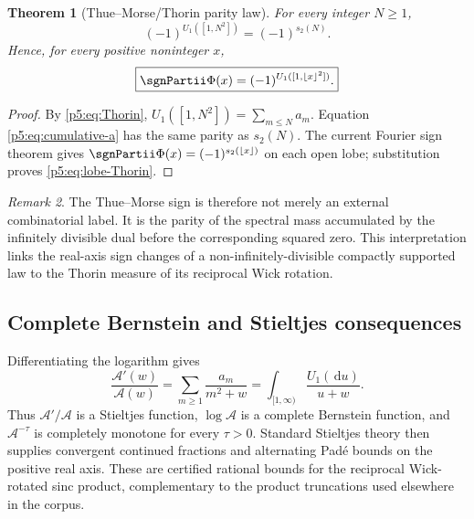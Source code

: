 \documentclass[11pt]{article}
\numberwithin{equation}{section}
\newtheorem{theorem}{Theorem}[section]
\theoremstyle{definition}
\theoremstyle{remark}
\newtheorem{remark}[theorem]{Remark}
\newcommand{\dd}{\,\mathrm d}
\begin{document}
\begin{theorem}[Thue--Morse/Thorin parity law]\label{p5:thm:Thorin-parity}
For every integer $N\ge1$,
\begin{equation}\label{p5:eq:Thorin-parity}
 \boxed{
 (-1)^{U_1([1,N^2])}=(-1)^{s_2(N)}.}
\end{equation}
Hence, for every positive noninteger $x$,
\begin{equation}\label{p5:eq:lobe-Thorin}
 \boxed{
 \sgnPartii\Phi(x)=(-1)^{U_1([1,\lfloor x\rfloor^2])}.}
\end{equation}
\end{theorem}

\begin{proof}
By \cref{p5:eq:Thorin}, $U_1([1,N^2])=\sum_{m\le N}a_m$.
Equation \cref{p5:eq:cumulative-a} has the same parity as $s_2(N)$.  The current
Fourier sign theorem gives
$\sgnPartii\Phi(x)=(-1)^{s_2(\lfloor x\rfloor)}$ on each open lobe; substitution
proves \cref{p5:eq:lobe-Thorin}.
\end{proof}

\begin{remark}
The Thue--Morse sign is therefore not merely an external combinatorial label.
It is the parity of the spectral mass accumulated by the infinitely divisible
dual before the corresponding squared zero.  This interpretation links the
real-axis sign changes of a non-infinitely-divisible compactly supported law to
the Thorin measure of its reciprocal Wick rotation.
\end{remark}

\subsection{Complete Bernstein and Stieltjes consequences}

Differentiating the logarithm gives
\begin{equation}\label{p5:eq:Stieltjes-logderivative}
 \frac{\mathcal A'(w)}{\mathcal A(w)}
 =\sum_{m\ge1}\frac{a_m}{m^2+w}
 =\int_{[1,\infty)}\frac{U_1(\dd u)}{u+w}.
\end{equation}
Thus $\mathcal A'/\mathcal A$ is a Stieltjes function,
$\log\mathcal A$ is a complete Bernstein function, and
$\mathcal A^{-\tau}$ is completely monotone for every $\tau>0$.  Standard
Stieltjes theory then supplies convergent continued fractions and alternating
Pad\'e bounds on the positive real axis.  These are certified rational bounds
for the reciprocal Wick-rotated sinc product, complementary to the product
truncations used elsewhere in the corpus.
\end{document}
